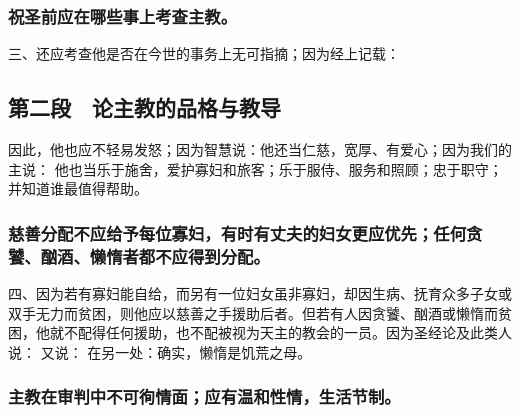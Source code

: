 
\subsubsection{祝圣前应在哪些事上考查主教。}

三、还应考查他是否在今世的事务上无可指摘；因为经上记载：\par


\subsection{第二段　论主教的品格与教导}

因此，他也应不轻易发怒；因为智慧说：他还当仁慈，宽厚、有爱心；因为我们的主说： 他也当乐于施舍，爱护寡妇和旅客；乐于服侍、服务和照顾；忠于职守；并知道谁最值得帮助。\par


\subsubsection{慈善分配不应给予每位寡妇，有时有丈夫的妇女更应优先；任何贪饕、酗酒、懒惰者都不应得到分配。}

四、因为若有寡妇能自给，而另有一位妇女虽非寡妇，却因生病、抚育众多子女或双手无力而贫困，则他应以慈善之手援助后者。但若有人因贪饕、酗酒或懒惰而贫困，他就不配得任何援助，也不配被视为天主的教会的一员。因为圣经论及此类人说： 又说： 在另一处：确实，懒惰是饥荒之母。\par


\subsubsection{主教在审判中不可徇情面；应有温和性情，生活节制。}

